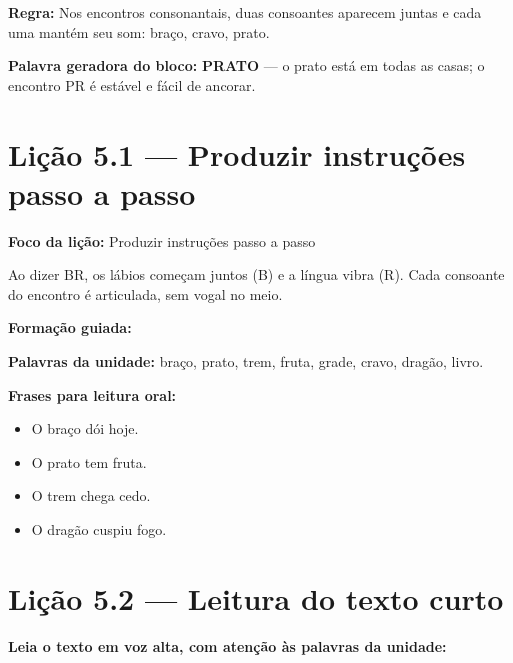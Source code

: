 \textbf{Regra:} Nos encontros consonantais, duas consoantes aparecem juntas e cada uma mantém seu som: braço, cravo, prato.

\textbf{Palavra geradora do bloco:} \textbf{PRATO} --- o prato está em todas as casas; o encontro PR é estável e fácil de ancorar.

\section{Lição 5.1 --- Produzir instruções passo a passo}

\textbf{Foco da lição:} Produzir instruções passo a passo


\begin{boquinha}
Ao dizer BR, os lábios começam juntos (B) e a língua vibra (R). Cada consoante do encontro é articulada, sem vogal no meio.
\end{boquinha}

\noindent\textbf{Formação guiada:}

\begin{center}
\end{center}

\noindent\textbf{Palavras da unidade:} braço, prato, trem, fruta, grade, cravo, dragão, livro.

\noindent\textbf{Frases para leitura oral:}
\begin{itemize}[leftmargin=1.6em]
  \item O braço dói hoje.
  \item O prato tem fruta.
  \item O trem chega cedo.
  \item O dragão cuspiu fogo.
\end{itemize}

\section{Lição 5.2 --- Leitura do texto curto}

\noindent\textbf{Leia o texto em voz alta, com atenção às palavras da unidade:}


